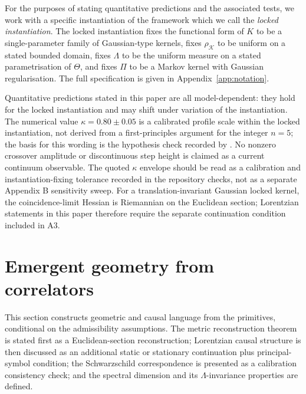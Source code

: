 ﻿\documentclass[12pt,a4paper]{article}
\theoremstyle{definition}
\begin{document}
For the purposes of stating quantitative predictions and the associated tests, we work with a specific instantiation of the framework which we call the \emph{locked instantiation}. The locked instantiation fixes the functional form of $K$ to be a single-parameter family of Gaussian-type kernels, fixes $\rho_{\mathcal{K}}$ to be uniform on a stated bounded domain, fixes $\Lambda$ to be the uniform measure on a stated parametrisation of $\Theta$, and fixes $\Pi$ to be a Markov kernel with Gaussian regularisation. The full specification is given in Appendix~\ref{app:notation}.

Quantitative predictions stated in this paper are all model-dependent: they hold for the locked instantiation and may shift under variation of the instantiation. The numerical value $\kappa = 0.80 \pm 0.05$ is a calibrated profile scale within the locked instantiation, not derived from a first-principles argument for the integer $n=5$; the basis for this wording is the hypothesis check recorded by . No nonzero crossover amplitude or discontinuous step height is claimed as a current continuum observable. The quoted $\kappa$ envelope should be read as a calibration and instantiation-fixing tolerance recorded in the repository checks, not as a separate Appendix B sensitivity sweep. For a translation-invariant Gaussian locked kernel, the coincidence-limit Hessian is Riemannian on the Euclidean section; Lorentzian statements in this paper therefore require the separate continuation condition included in A3.

\section{Emergent geometry from correlators}
\label{sec:emergent_geometry}

This section constructs geometric and causal language from the primitives, conditional on the admissibility assumptions. The metric reconstruction theorem is stated first as a Euclidean-section reconstruction; Lorentzian causal structure is then discussed as an additional static or stationary continuation plus principal-symbol condition; the Schwarzschild correspondence is presented as a calibration consistency check; and the spectral dimension and its $\Lambda$-invariance properties are defined.
\end{document}

